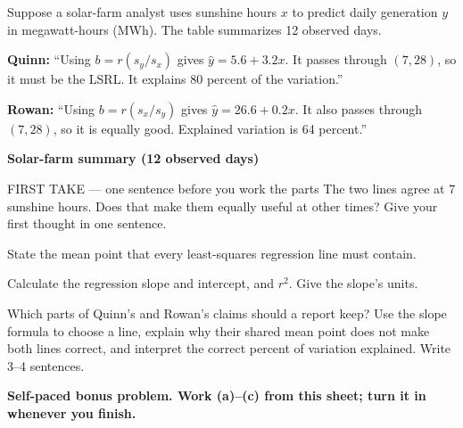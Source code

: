 \documentclass[14pt]{extarticle}
\begin{document}
\pagestyle{empty}


\noindent\begin{minipage}[t]{0.57\linewidth}
\vspace{0pt}
Suppose a solar-farm analyst uses sunshine hours $x$ to predict daily generation $y$ in megawatt-hours (MWh). The table summarizes 12 observed days.\par\smallskip \textbf{Quinn:} ``Using $b=r(s_y/s_x)$ gives $\hat y=5.6+3.2x$. It passes through $(7,28)$, so it must be the LSRL. It explains 80 percent of the variation.''\par \textbf{Rowan:} ``Using $b=r(s_x/s_y)$ gives $\hat y=26.6+0.2x$. It also passes through $(7,28)$, so it is equally good. Explained variation is 64 percent.''\par
\end{minipage}\hfill
\begin{minipage}[t]{0.40\linewidth}
\vspace{0pt}
\begin{center}
\textbf{Solar-farm summary (12 observed days)}\par\smallskip
{}
\end{center}
\end{minipage}

\begin{firsttakebox}{FIRST TAKE --- one sentence before you work the parts}
The two lines agree at 7 sunshine hours. Does that make them equally useful at other times? Give your first thought in one sentence.
\end{firsttakebox}

\begin{description}[leftmargin=1.15in, labelwidth=1in, itemsep=2pt, topsep=2pt]
  \item[\dokbadge{1}~(a)] State the mean point that every least-squares regression line must contain.
  \item[\dokbadge{2}~(b)] Calculate the regression slope and intercept, and $r^2$. Give the slope's units.
  \item[\dokbadge{3}~(c)] Which parts of Quinn's and Rowan's claims should a report keep? Use the slope formula to choose a line, explain why their shared mean point does not make both lines correct, and interpret the correct percent of variation explained. Write 3--4 sentences.
\end{description}

\vfill
\textbf{Self-paced bonus problem. Work (a)--(c) from this sheet; turn it in whenever you finish.}
\end{document}
